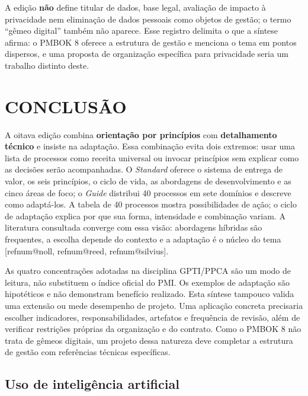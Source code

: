 \documentclass[12pt,a4paper,article,oneside,english,brazil]{abntex2}
\makeatletter
\newcommand{\refnum}[1]{\csname refnum@#1\endcsname}
\newif\ifavisofinal  \avisofinaltrue    %
\makeatother
\begin{document}
A edição \textbf{não} define titular de dados, base legal, avaliação de impacto à privacidade nem eliminação de dados pessoais como objetos de gestão; o termo \textquotedblleft{}gêmeo digital\textquotedblright{} também não aparece. Esse registro delimita o que a síntese afirma: o PMBOK 8 oferece a estrutura de gestão e menciona o tema em pontos dispersos, e uma proposta de organização específica para privacidade seria um trabalho distinto deste.

\section{CONCLUSÃO}

A oitava edição combina \textbf{orientação por princípios} com \textbf{detalhamento técnico} e insiste na adaptação. Essa combinação evita dois extremos: usar uma lista de processos como receita universal ou invocar princípios sem explicar como as decisões serão acompanhadas. O \textit{Standard} oferece o sistema de entrega de valor, os seis princípios, o ciclo de vida, as abordagens de desenvolvimento e as cinco áreas de foco; o \textit{Guide} distribui 40 processos em sete domínios e descreve como adaptá-los. A tabela de 40 processos mostra possibilidades de ação; o ciclo de adaptação explica por que sua forma, intensidade e combinação variam. A literatura consultada converge com essa visão: abordagens híbridas são frequentes, a escolha depende do contexto e a adaptação é o núcleo do tema [\refnum{noll}, \refnum{reed}, \refnum{silvius}].

As quatro concentrações adotadas na disciplina GPTI/PPCA são um modo de leitura, não substituem o índice oficial do PMI. Os exemplos de adaptação são hipotéticos e não demonstram benefício realizado. Esta síntese tampouco valida uma extensão ou mede desempenho de projeto. Uma aplicação concreta precisaria escolher indicadores, responsabilidades, artefatos e frequência de revisão, além de verificar restrições próprias da organização e do contrato. Como o PMBOK 8 não trata de gêmeos digitais, um projeto dessa natureza deve completar a estrutura de gestão com referências técnicas específicas.

\ifavisofinal
\subsection{Uso de inteligência artificial}
\end{document}
